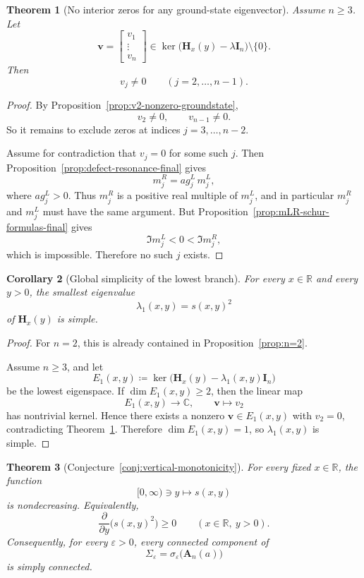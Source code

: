 \documentclass[11pt]{article}
\newtheorem{theorem}{Theorem}
\newtheorem{corollary}[theorem]{Corollary}
\begin{document}
\begin{theorem}[No interior zeros for any ground-state eigenvector]\label{thm:no-interior-zeros-groundstate}
Assume \(n\ge 3\). Let
\[
\mathbf v=
\begin{bmatrix}
v_1\\ \vdots\\ v_n
\end{bmatrix}
\in \ker\bigl(\mathbf H_x(y)-\lambda\mathbf I_n\bigr)\setminus\{0\}.
\]
Then
\[
v_j\neq 0
\qquad
(j=2,\dots,n-1).
\]
\end{theorem}

\begin{proof}
By Proposition~\ref{prop:v2-nonzero-groundstate},
\[
v_2\neq 0,
\qquad
v_{n-1}\neq 0.
\]
So it remains to exclude zeros at indices \(j=3,\dots,n-2\).

Assume for contradiction that \(v_j=0\) for some such \(j\). Then
Proposition~\ref{prop:defect-resonance-final} gives
\[
m_j^R=a g_j^L\,m_j^L,
\]
where \(a g_j^L>0\). Thus \(m_j^R\) is a positive real multiple of \(m_j^L\), and in particular
\(m_j^R\) and \(m_j^L\) must have the same argument. But
Proposition~\ref{prop:mLR-schur-formulas-final} gives
\[
\Im m_j^L<0<\Im m_j^R,
\]
which is impossible. Therefore no such \(j\) exists.
\end{proof}

\begin{corollary}[Global simplicity of the lowest branch]\label{cor:global-simplicity-lowest-branch}
For every \(x\in\mathbb R\) and every \(y>0\), the smallest eigenvalue
\[
\lambda_1(x,y)=s(x,y)^2
\]
of \(\mathbf H_x(y)\) is simple.
\end{corollary}

\begin{proof}
For \(n=2\), this is already contained in Proposition~\ref{prop:n=2}.

Assume \(n\ge 3\), and let
\[
E_1(x,y)\coloneqq \ker\bigl(\mathbf H_x(y)-\lambda_1(x,y)\mathbf I_n\bigr)
\]
be the lowest eigenspace. If \(\dim E_1(x,y)\ge 2\), then the linear map
\[
E_1(x,y)\longrightarrow \mathbb C,
\qquad
\mathbf v\longmapsto v_2
\]
has nontrivial kernel. Hence there exists a nonzero \(\mathbf v\in E_1(x,y)\) with \(v_2=0\), contradicting
Theorem~\ref{thm:no-interior-zeros-groundstate}. Therefore \(\dim E_1(x,y)=1\), so \(\lambda_1(x,y)\) is simple.
\end{proof}

\begin{theorem}[Conjecture~\ref{conj:vertical-monotonicity}]\label{thm:vertical-monotonicity-complete}
For every fixed \(x\in\mathbb R\), the function
\[
[0,\infty)\ni y\longmapsto s(x,y)
\]
is nondecreasing. Equivalently,
\[
\frac{\partial}{\partial y}\bigl(s(x,y)^2\bigr)\ge 0
\qquad
(x\in\mathbb R,\ y>0).
\]
Consequently, for every \(\varepsilon>0\), every connected component of
\[
\Sigma_\varepsilon=\sigma_\varepsilon\bigl(\mathbf A_n(a)\bigr)
\]
is simply connected.
\end{theorem}
\end{document}
